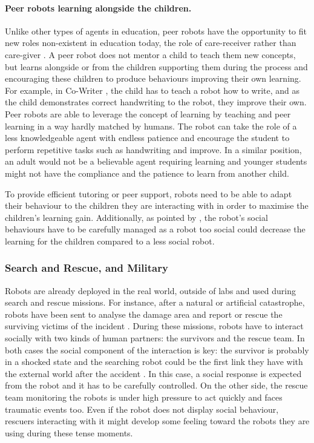 	\paragraph{Peer robots learning alongside the children.}
	Unlike other types of agents in education, peer robots have the opportunity to fit new roles non-existent in education today, the role of care-receiver rather than care-giver \citep{tanaka2012children}. A peer robot does not mentor a child to teach them new concepts, but learns alongside or from the children supporting them during the process and encouraging these children to produce behaviours improving their own learning. For example, in Co-Writer \citep{hood2015children}, the child has to teach a robot how to write, and as the child demonstrates correct handwriting to the robot, they improve their own. Peer robots are able to leverage the concept of learning by teaching \citep{frager1970learning} and peer learning \citep{topping2005trends} in a way hardly matched by humans. The robot can take the role of a less knowledgeable agent with endless patience and encourage the student to perform repetitive tasks such as handwriting and improve. In a similar position, an adult would not be a believable agent requiring learning and younger students might not have the compliance and the patience to learn from another child.
	
	To provide efficient tutoring or peer support, robots need to be able to adapt their behaviour to the children they are interacting with in order to maximise the children's learning gain. Additionally, as pointed by \citet{kennedy2015robot}, the robot's social behaviours have to be carefully managed as a robot too social could decrease the learning for the children compared to a less social robot. 
	
\subsubsection{Search and Rescue, and Military} 
	
    Robots are already deployed in the real world, outside of labs and used during search and rescue missions. For instance, after a natural or artificial catastrophe, robots have been sent to analyse the damage area and report or rescue the surviving victims of the incident \citep{murphy2008search}. During these missions, robots have to interact socially with two kinds of human partners: the survivors and the rescue team. In both cases the social component of the interaction is key: the survivor is probably in a shocked state and the searching robot could be the first link they have with the external world after the accident \citep{murphy2008search}. In this case, a social response is expected from the robot and it has to be carefully controlled. On the other side, the rescue team monitoring the robots is under high pressure to act quickly and faces traumatic events too. Even if the robot does not display social behaviour, rescuers interacting with it might develop some feeling toward the robots they are using during these tense moments\citep{fincannon2004evidence}.
	
